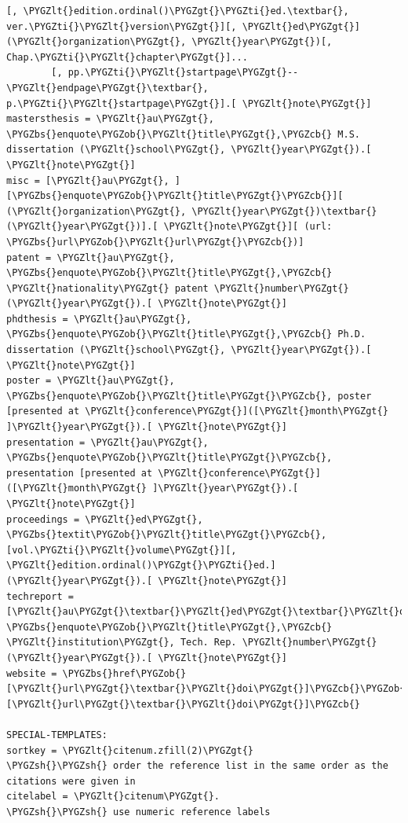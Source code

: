 \documentclass[letterpaper,10pt,english]{sphinxmanual}
\def\PYGZbs{\char`\\}
\def\PYGZob{\char`\{}
\def\PYGZcb{\char`\}}
\def\PYGZlt{\char`\<}
\def\PYGZgt{\char`\>}
\def\PYGZsh{\char`\#}
\def\PYGZti{\char`\~}
\begin{document}
\begin{Verbatim}[commandchars=\\\{\}]
        [, \PYGZlt{}edition.ordinal()\PYGZgt{}\PYGZti{}ed.\textbar{}, ver.\PYGZti{}\PYGZlt{}version\PYGZgt{}][, \PYGZlt{}ed\PYGZgt{}] (\PYGZlt{}organization\PYGZgt{}, \PYGZlt{}year\PYGZgt{})[, Chap.\PYGZti{}\PYGZlt{}chapter\PYGZgt{}]...
        [, pp.\PYGZti{}\PYGZlt{}startpage\PYGZgt{}--\PYGZlt{}endpage\PYGZgt{}\textbar{}, p.\PYGZti{}\PYGZlt{}startpage\PYGZgt{}].[ \PYGZlt{}note\PYGZgt{}]
mastersthesis = \PYGZlt{}au\PYGZgt{}, \PYGZbs{}enquote\PYGZob{}\PYGZlt{}title\PYGZgt{},\PYGZcb{} M.S. dissertation (\PYGZlt{}school\PYGZgt{}, \PYGZlt{}year\PYGZgt{}).[ \PYGZlt{}note\PYGZgt{}]
misc = [\PYGZlt{}au\PYGZgt{}, ][\PYGZbs{}enquote\PYGZob{}\PYGZlt{}title\PYGZgt{}\PYGZcb{}][ (\PYGZlt{}organization\PYGZgt{}, \PYGZlt{}year\PYGZgt{})\textbar{} (\PYGZlt{}year\PYGZgt{})].[ \PYGZlt{}note\PYGZgt{}][ (url: \PYGZbs{}url\PYGZob{}\PYGZlt{}url\PYGZgt{}\PYGZcb{})]
patent = \PYGZlt{}au\PYGZgt{}, \PYGZbs{}enquote\PYGZob{}\PYGZlt{}title\PYGZgt{},\PYGZcb{} \PYGZlt{}nationality\PYGZgt{} patent \PYGZlt{}number\PYGZgt{} (\PYGZlt{}year\PYGZgt{}).[ \PYGZlt{}note\PYGZgt{}]
phdthesis = \PYGZlt{}au\PYGZgt{}, \PYGZbs{}enquote\PYGZob{}\PYGZlt{}title\PYGZgt{},\PYGZcb{} Ph.D. dissertation (\PYGZlt{}school\PYGZgt{}, \PYGZlt{}year\PYGZgt{}).[ \PYGZlt{}note\PYGZgt{}]
poster = \PYGZlt{}au\PYGZgt{}, \PYGZbs{}enquote\PYGZob{}\PYGZlt{}title\PYGZgt{}\PYGZcb{}, poster [presented at \PYGZlt{}conference\PYGZgt{}]([\PYGZlt{}month\PYGZgt{} ]\PYGZlt{}year\PYGZgt{}).[ \PYGZlt{}note\PYGZgt{}]
presentation = \PYGZlt{}au\PYGZgt{}, \PYGZbs{}enquote\PYGZob{}\PYGZlt{}title\PYGZgt{}\PYGZcb{}, presentation [presented at \PYGZlt{}conference\PYGZgt{}]([\PYGZlt{}month\PYGZgt{} ]\PYGZlt{}year\PYGZgt{}).[ \PYGZlt{}note\PYGZgt{}]
proceedings = \PYGZlt{}ed\PYGZgt{}, \PYGZbs{}textit\PYGZob{}\PYGZlt{}title\PYGZgt{}\PYGZcb{}, [vol.\PYGZti{}\PYGZlt{}volume\PYGZgt{}][, \PYGZlt{}edition.ordinal()\PYGZgt{}\PYGZti{}ed.] (\PYGZlt{}year\PYGZgt{}).[ \PYGZlt{}note\PYGZgt{}]
techreport = [\PYGZlt{}au\PYGZgt{}\textbar{}\PYGZlt{}ed\PYGZgt{}\textbar{}\PYGZlt{}organization\PYGZgt{}\textbar{}\PYGZlt{}institution\PYGZgt{}\textbar{}], \PYGZbs{}enquote\PYGZob{}\PYGZlt{}title\PYGZgt{},\PYGZcb{} \PYGZlt{}institution\PYGZgt{}, Tech. Rep. \PYGZlt{}number\PYGZgt{} (\PYGZlt{}year\PYGZgt{}).[ \PYGZlt{}note\PYGZgt{}]
website = \PYGZbs{}href\PYGZob{}[\PYGZlt{}url\PYGZgt{}\textbar{}\PYGZlt{}doi\PYGZgt{}]\PYGZcb{}\PYGZob{}[\PYGZlt{}url\PYGZgt{}\textbar{}\PYGZlt{}doi\PYGZgt{}]\PYGZcb{}

SPECIAL-TEMPLATES:
sortkey = \PYGZlt{}citenum.zfill(2)\PYGZgt{}              \PYGZsh{}\PYGZsh{} order the reference list in the same order as the citations were given in
citelabel = \PYGZlt{}citenum\PYGZgt{}.                    \PYGZsh{}\PYGZsh{} use numeric reference labels


\end{Verbatim}
\end{document}
